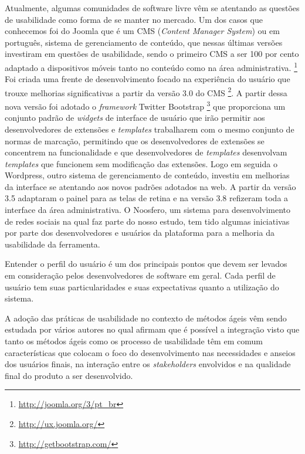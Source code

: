 Atualmente, algumas comunidades de software livre vêm se atentando as questões de usabilidade como forma de se manter no mercado. Um dos casos que conhecemos foi do Joomla que é um CMS (\textit{Content Manager System}) ou em português, sistema de gerenciamento de conteúdo, que nessas últimas versões investiram em questões de usabilidade, sendo o primeiro CMS a ser 100 por cento adaptado a dispositivos móveis tanto no conteúdo como na área administrativa. \footnote{\url{http://joomla.org/3/pt_br}}
Foi criada uma frente de desenvolvimento focado na experiência do usuário que trouxe melhorias significativas a partir da versão 3.0 do CMS \footnote{\url{http://ux.joomla.org/}}. A partir dessa nova versão foi adotado o \textit{framework} Twitter Bootstrap \footnote{\url{http://getbootstrap.com/}} que proporciona um conjunto padrão de \textit{widgets} de interface de usuário que irão permitir aos desenvolvedores de extensões e \textit{templates}  trabalharem com o mesmo conjunto de normas de marcação, permitindo que os desenvolvedores de extensões se concentrem na funcionalidade e que desenvolvedores de \textit{templates} desenvolvam \textit{templates} que funcionem sem modificação das extensões. 
Logo em seguida o Wordpress, outro sistema de gerenciamento de conteúdo, investiu em melhorias da interface se atentando aos novos padrões adotados na web. A partir da versão 3.5 adaptaram o painel para as telas de retina e na versão 3.8 refizeram toda a interface da área administrativa.
O Noosfero, um sistema para desenvolvimento de redes sociais na qual faz parte do nosso estudo, tem tido algumas iniciativas por parte dos desenvolvedores e usuários da plataforma para a melhoria da usabilidade da ferramenta. 

Entender o perfil do usuário é um dos principais pontos que devem ser levados em consideração pelos desenvolvedores de software em geral. Cada perfil de usuário tem suas particularidades e suas expectativas quanto a utilização do sistema. %

A adoção das práticas de usabilidade no contexto de métodos ágeis vêm sendo estudada por vários autores no qual afirmam que é possível a integração visto que tanto os métodos ágeis como os processo de usabilidade têm em comum características que colocam o foco do desenvolvimento nas necessidades e anseios dos usuários finais, na interação entre os \textit{stakeholders} envolvidos e na qualidade final do produto a ser desenvolvido.

